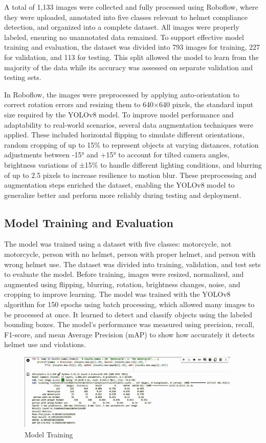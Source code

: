 \begin{refsection}
A total of 1,133 images were collected and fully processed using Roboflow, where they were uploaded, annotated into five classes relevant to helmet compliance detection, and organized into a complete dataset. All images were properly labeled, ensuring no unannotated data remained. To support effective model training and evaluation, the dataset was divided into 793 images for training, 227 for validation, and 113 for testing. This split allowed the model to learn from the majority of the data while its accuracy was assessed on separate validation and testing sets.

In Roboflow, the images were preprocessed by applying auto-orientation to correct rotation errors and resizing them to 640×640 pixels, the standard input size required by the YOLOv8 model. To improve model performance and adaptability to real-world scenarios, several data augmentation techniques were applied. These included horizontal flipping to simulate different orientations, random cropping of up to 15\% to represent objects at varying distances, rotation adjustments between -15° and +15° to account for tilted camera angles, brightness variations of ±15\% to handle different lighting conditions, and blurring of up to 2.5 pixels to increase resilience to motion blur. These preprocessing and augmentation steps enriched the dataset, enabling the YOLOv8 model to generalize better and perform more reliably during testing and deployment.

\subsection{Model Training and Evaluation}
\noindent
The model was trained using a dataset with five classes: motorcycle, not motorcycle, person with no helmet, person with proper helmet, and person with wrong helmet use. The dataset was divided into training, validation, and test sets to evaluate the model. Before training, images were resized, normalized, and augmented using flipping, blurring, rotation, brightness changes, noise, and cropping to improve learning. The model was trained with the YOLOv8 algorithm for 150 epochs using batch processing, which allowed many images to be processed at once. It learned to detect and classify objects using the labeled bounding boxes. The model’s performance was measured using precision, recall, F1-score, and mean Average Precision (mAP) to show how accurately it detects helmet use and violations.

\begin{figure}[H]
    \centering
    \includegraphics[width=0.95\textwidth]{figures/Fig 13.jpg}
    \caption{Model Training}
    \label{fig:model_training}
\end{figure}



\end{refsection}
